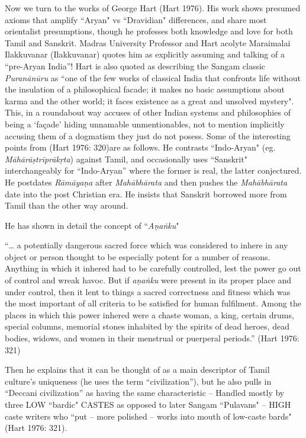 Now we turn to the works of George Hart (Hart 1976). His work shows presumed axioms that amplify “Aryan" vs “Dravidian" differences, and share most orientalist presumptions, though he professes both knowledge and love for both Tamil and Sanskrit. Madras University Professor and Hart acolyte Maraimalai Ilakkuvanar (Ilakkuvanar) quotes him as explicitly assuming and talking of a “pre-Aryan India”! Hart is also quoted as describing the Sangam classic \textit{Puranānūru} as “one of the few works of classical India that confronts life without the insulation of a philosophical facade; it makes no basic assumptions about karma and the other world; it faces existence as a great and unsolved mystery". This, in a roundabout way accuses of other Indian systems and philosophies of being a ‘façade’ hiding unnamable unmentionables, not to mention implicitly accusing them of a dogmatism they just do not posess. Some of the interesting points from (Hart 1976: 320)are as follows. He contrasts “Indo-Aryan" (eg. \textit{Māhārāṣtrīprākṛta}) against Tamil, and occasionally uses “Sanskrit" interchangeably for “Indo-Aryan” where the former is real, the latter conjectured. He postdates \textit{Rāmāyaṇa} after \textit{Mahābhārata} and then pushes the \textit{Mahābhārata} date into the post Christian era. He insists that Sanskrit borrowed more from Tamil than the other way around.

He has shown in detail the concept of “\textit{Aṇaṅku}"

“… a potentially dangerous sacred force which was considered to inhere in any object or person thought to be especially potent for a number of reasons. Anything in which it inhered had to be carefully controlled, lest the power go out of control and wreak havoc. But if \textit{aṇaṅku} were present in its proper place and under control, then it lent to things a sacred correctness and fitness which was the most important of all criteria to be satisfied for human fulfilment. Among the places in which this power inhered were a chaste woman, a king, certain drums, special columns, memorial stones inhabited by the spirits of dead heroes, dead bodies, widows, and women in their menstrual or puerperal periods.” (Hart 1976: 321)

Then he explains that it can be thought of as a main descriptor of Tamil culture’s uniqueness (he uses the term “civilization”), but he also pulls in “Deccani civilization” as having the same characteristic – Handled mostly by three LOW “bardic" CASTES as opposed to later Sangam “Pulavans" – HIGH caste writers who “put – more polished – works into mouth of low-caste bards" (Hart 1976: 321).

